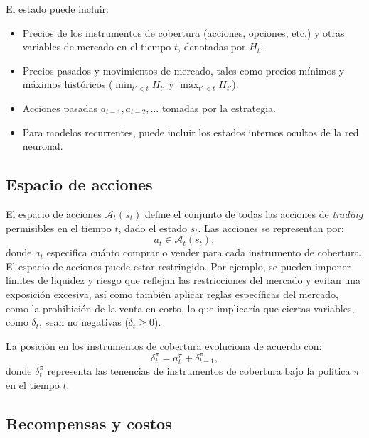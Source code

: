 \documentclass[11pt,a4paper,spanish]{article}
\numberwithin{equation}{section} %
\begin{document}
El estado puede incluir:
\begin{itemize}
    \item Precios de los instrumentos de cobertura (acciones, opciones, etc.) y otras variables de mercado en el tiempo \( t \), denotadas por \( H_t \).
    \item Precios pasados y movimientos de mercado, tales como precios mínimos y máximos históricos (\( \min_{t' < t} H_{t'} \) y \( \max_{t' < t} H_{t'} \)).
    \item Acciones pasadas \( a_{t-1}, a_{t-2}, \dots \) tomadas por la estrategia.
    \item Para modelos recurrentes, puede incluir los estados internos ocultos de la red neuronal.
\end{itemize}

\subsection{Espacio de acciones}

El espacio de acciones \( \mathcal{A}_t(s_t) \) define el conjunto de todas las acciones de \textit{trading} permisibles en el tiempo \( t \), dado el estado \( s_t \). Las acciones se representan por:
\begin{equation}
a_t \in \mathcal{A}_t(s_t),
\end{equation}
donde \( a_t \) especifica cuánto comprar o vender para cada instrumento de cobertura.
El espacio de acciones puede estar restringido. Por ejemplo, se pueden imponer límites de liquidez y riesgo que reflejan las restricciones del mercado y evitan una exposición excesiva, así como también aplicar reglas específicas del mercado, como la prohibición de la venta en corto, lo que implicaría que ciertas variables, como \( \delta_t \), sean no negativas (\( \delta_t \geq 0 \)).


La posición en los instrumentos de cobertura evoluciona de acuerdo con:
\begin{equation}
\delta_t^\pi = a_t^\pi + \delta_{t-1}^\pi,
\end{equation}
donde \( \delta_t^\pi \) representa las tenencias de instrumentos de cobertura bajo la política \( \pi \) en el tiempo \( t \).

\subsection{Recompensas y costos}
\end{document}
